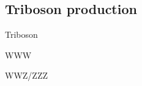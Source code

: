 \documentclass[10pt]{article}
\begin{document}
\subsection{Triboson production}



Triboson

WWW

WWZ/ZZZ

















 


\end{document}

